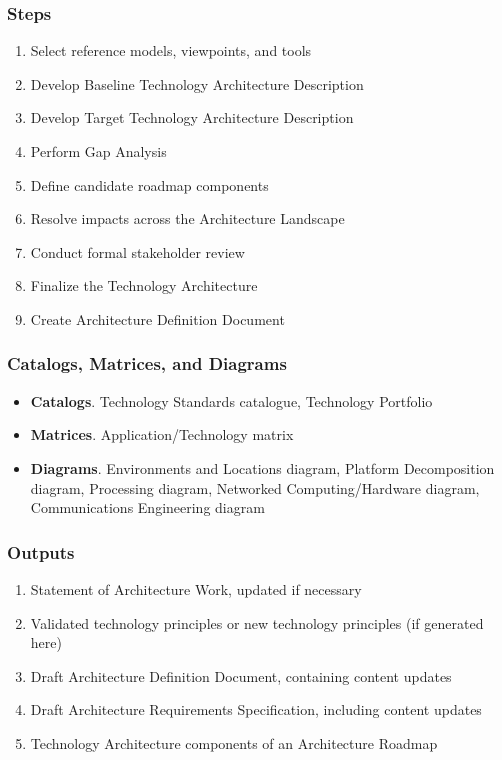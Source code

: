 \documentclass[aspectratio=169, table]{beamer}
\begin{document}
	\begin{frame}
		\frametitle{Steps}
		\vspace{20pt}
		\begin{enumerate}
			\item Select reference models, viewpoints, and tools
			\item Develop Baseline Technology Architecture Description
			\item Develop Target Technology Architecture Description
			\item Perform Gap Analysis
			\item Define candidate roadmap components
			\item Resolve impacts across the Architecture Landscape
			\item Conduct formal stakeholder review
			\item Finalize the Technology Architecture
			\item Create Architecture Definition Document
		\end{enumerate}
	\end{frame}
	
	\begin{frame}
		\frametitle{Catalogs, Matrices, and Diagrams}
		\begin{itemize}
			\item \textbf{Catalogs}. Technology Standards catalogue, Technology Portfolio
			\item \textbf{Matrices}. Application/Technology matrix
			\item \textbf{Diagrams}. Environments and Locations diagram, Platform Decomposition diagram, Processing diagram, Networked Computing/Hardware diagram, Communications Engineering diagram
		\end{itemize}
	\end{frame}
	
	\begin{frame}
		\frametitle{Outputs}
		\begin{enumerate}
			\item Statement of Architecture Work, updated if necessary
			\item Validated technology principles or new technology principles (if generated here)
			\item Draft Architecture Definition Document, containing content updates 
			\item Draft Architecture Requirements Specification, including content updates
			\item Technology Architecture components of an Architecture Roadmap
		\end{enumerate}
	\end{frame}
	
\end{document}
